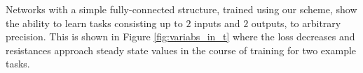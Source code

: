 \documentclass[%
 reprint,
 amsmath,amssymb,
 aps,
]{revtex4-2}
\begin{document}
    Networks with a simple fully-connected structure, trained using our scheme, show the ability to learn tasks consisting up to $2$ inputs and $2$ outputs, to arbitrary precision. This is shown in Figure \ref{fig:variabs_in_t} where the loss decreases and resistances approach steady state values in the course of training for two example tasks.
    
\end{document}
